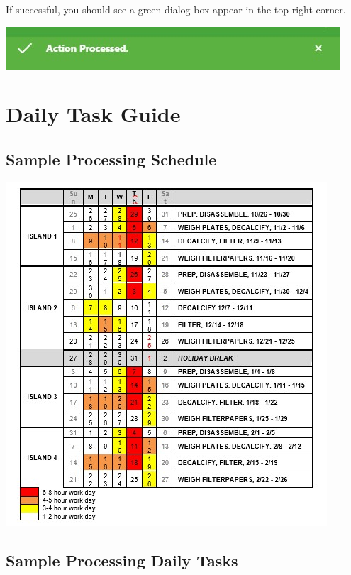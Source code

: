 \documentclass[]{book}
\begin{document}
If successful, you should see a green dialog box appear in the top-right corner.

\includegraphics{images/Data25.jpg}

\hypertarget{daily-task-guide}{%
\section{Daily Task Guide}\label{daily-task-guide}}

\hypertarget{sample-processing-schedule}{%
\subsection{Sample Processing Schedule}\label{sample-processing-schedule}}

\includegraphics{images/DailyTasks1.jpg}

\hypertarget{sample-processing-daily-tasks}{%
\subsection{Sample Processing Daily Tasks}\label{sample-processing-daily-tasks}}
\end{document}
